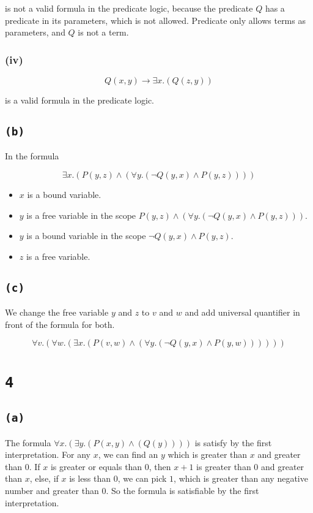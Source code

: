 \documentclass[a4paper,11pt]{report}
\begin{document}
is not a valid formula in the predicate logic, because the predicate $Q$ has a
predicate in its parameters, which is not allowed. Predicate only allows terms
as parameters, and $Q$ is not a term.

\subsubsection*{(iv)}
\[
  Q(x,y) \to \exists x.(Q(z,y))
\]

is a valid formula in the predicate logic.


\subsection*{\texttt{(b)}}

In the formula

\[
  \exists x.(P(y,z) \wedge (\forall y.(\neg Q(y,x) \wedge P(y,z))))
\]

\begin{itemize}
\item $x$ is a bound variable.
\item $y$ is a free variable in the scope $P(y,z) \wedge (\forall y.(\neg Q(y,x) \wedge P(y,z)))$.
\item $y$ is a bound variable in the scope $\neg Q(y,x) \wedge P(y,z)$.
\item $z$ is a free variable.
\end{itemize}

\subsection*{\texttt{(c)}}

We change the free variable $y$ and $z$ to $v$ and $w$ and add universal
quantifier in front of the formula for both.

\[
  \forall v.(\forall w.( \exists x.(P(v,w) \wedge (\forall y.(\neg Q(y,x) \wedge P(y,w))))))
\]

\section*{\texttt{4}}

\subsection*{\texttt{(a)}}

The formula $\forall x.(\exists y.(P(x,y) \wedge (Q(y))))$ is satisfy by the
first interpretation. For any $x$, we can find an $y$ which is greater than $x$
and greater than $0$. If $x$ is greater or equals than $0$, then $x + 1$ is
greater than $0$ and greater than $x$, else, if $x$ is less than $0$, we can
pick $1$, which is greater than any negative number and greater than $0$. So the
formula is satisfiable by the first interpretation.
\end{document}
